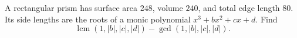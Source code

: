 A rectangular prism has surface area $248$, volume $240$, and total edge length $80$. Its side lengths are the roots of a monic polynomial $x^3+bx^2+cx+d$. Find
\[\operatorname{lcm}(1,|b|,|c|,|d|)-\gcd(1,|b|,|c|,|d|).\]
